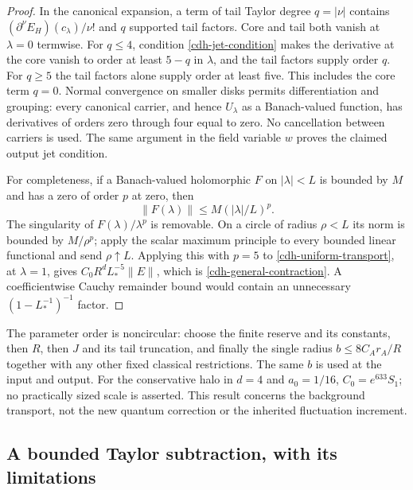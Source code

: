 \documentclass[11pt]{article}
\theoremstyle{remark}
\begin{document}
\begin{proof}
In the canonical expansion, a term of tail Taylor degree
$q=|\nu|$ contains
$(\partial^\nu E_H)(c_\lambda)/\nu!$ and $q$ supported tail
factors. Core and tail both vanish at $\lambda=0$ termwise.
For $q\leq4$, condition \eqref{cdh-jet-condition} makes the
derivative at the core vanish to order at least $5-q$ in
$\lambda$, and the tail factors supply order $q$.
For $q\geq5$ the tail factors alone supply order at least five.
This includes the core term $q=0$.
Normal convergence on smaller disks permits differentiation
and grouping: every canonical carrier, and hence $U_\lambda$
as a Banach-valued function, has derivatives of orders zero
through four equal to zero. No cancellation between carriers
is used. The same argument in the field variable $w$ proves
the claimed output jet condition.

For completeness, if a Banach-valued holomorphic $F$ on
$|\lambda|<L$ is bounded by $M$ and has a zero of order $p$ at
zero, then
\begin{equation}
 \|F(\lambda)\|\leq M(|\lambda|/L)^p.
 \label{cdh-Banach-Schwarz}
\end{equation}
The singularity of $F(\lambda)/\lambda^p$ is removable.
On a circle of radius $\rho<L$ its norm is bounded by
$M/\rho^p$; apply the scalar maximum principle to every
bounded linear functional and send $\rho\uparrow L$.
Applying this with $p=5$ to
\eqref{cdh-uniform-transport}, at $\lambda=1$, gives
$C_0R^dL_*^{-5}\|E\|$, which is
\eqref{cdh-general-contraction}. A coefficientwise Cauchy
remainder bound would contain an unnecessary
$(1-L_*^{-1})^{-1}$ factor.
\end{proof}

The parameter order is noncircular: choose the finite reserve
and its constants, then $R$, then $J$ and its tail truncation,
and finally the single radius $b\leq8C_A r_A/R$ together with
any other fixed classical restrictions. The same $b$ is used
at the input and output. For the conservative halo in $d=4$
and $a_0=1/16$, $C_0=e^{633}S_1$; no practically sized scale
is asserted. This result concerns the background transport,
not the new quantum correction or the inherited fluctuation
increment.

\subsection{A bounded Taylor subtraction, with its limitations}
\label{cdh-projection-section}
\end{document}
